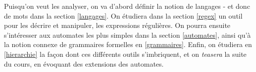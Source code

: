 Puisqu'on veut les analyser, on va d'abord définir la notion de langages - et donc de mots dans la section \ref{langages}. On étudiera dans la section \ref{regex} un outil pour les décrire et manipuler, les expressions régulières. On pourra ensuite s'intéresser aux automates les plus simples dans la section \ref{automates}, ainsi qu'à la notion connexe de grammaires formelles en \ref{grammaires}. Enfin, on étudiera en \ref{hierarchie} la façon dont ces différents outils s'imbriquent, et on \textit{teasera} la suite du cours, en évoquant des extensions des automates.
